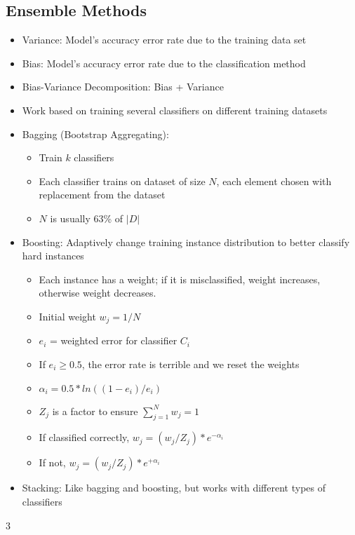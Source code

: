 \documentclass[fontsize=4pt]{scrartcl}
\begin{document}
\begin{multicols}{3}
\subsection{Ensemble Methods}
\begin{itemize}
	\item Variance: Model's accuracy error rate due to the training data set
	\item Bias: Model's accuracy error rate due to the classification method
	\item Bias-Variance Decomposition: Bias + Variance
	\item Work based on training several classifiers on different training datasets
	\item Bagging (Bootstrap Aggregating):
		\begin{itemize}
			\item Train $k$ classifiers
			\item Each classifier trains on dataset of size $N$, each element chosen with replacement from the dataset
			\item $N$ is usually 63\% of $|D|$
		\end{itemize}
	\item Boosting: Adaptively change training instance distribution to better classify hard instances
		\begin{itemize}
			\item Each instance has a weight; if it is misclassified, weight increases, otherwise weight decreases.
			\item Initial weight $w_j = 1/N$
			\item $e_i$ = weighted error for classifier $C_i$
			\item If $e_i \geq 0.5$, the error rate is terrible and we reset the weights
			\item $\alpha_i = 0.5 * ln( (1 - e_i) / e_i)$
			\item $Z_j$ is a factor to ensure $\sum_{j=1}^{N} w_j = 1$
			\item If classified correctly, $w_j = (w_j / Z_j) * e ^ {-\alpha_i}$
			\item If not, $w_j = (w_j / Z_j) * e ^ {+\alpha_i}$
		\end{itemize}
	\item Stacking: Like bagging and boosting, but works with different types of classifiers
\end{itemize}
\end{multicols}{3}
\end{document}
